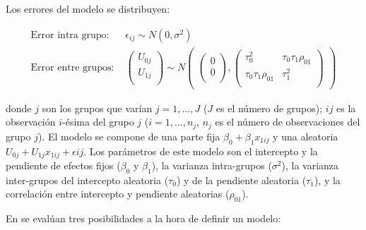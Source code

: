 \documentclass[
  12pt,
  a4paper,
  extrafontsizes,
  onecolumn,
  openright,
  table]{memoir}
\begin{document}
Los errores del modelo se distribuyen:

\[
\begin{aligned}
\text{Error intra grupo: } &  \epsilon_{ij} \sim N(0, \sigma^2) \\
\text{Error entre grupos: } &
\begin{pmatrix}
     U_{0j} \\
     U_{1j} \\
\end{pmatrix} 
\sim
N
\begin{pmatrix}
\begin{pmatrix}
     0 \\
     0 \\
\end{pmatrix},
\begin{pmatrix}
     \tau_0^2 & \tau_0\tau_1\rho_{01} \\
     \tau_0\tau_1\rho_{01} &  \tau_1^2 \\
\end{pmatrix}
\end{pmatrix} 
\end{aligned}
\]

donde \(j\) son los grupos que varían \(j = 1,...,J\) (\(J\) es el
número de grupos); \(ij\) es la observación \(i\)-ésima del grupo \(j\)
(\(i = 1,...,n_j\), \(n_j\) es el número de observaciones del grupo
\(j\)). El modelo se compone de una parte fija
\(\beta_0 + \beta_1 x_{1ij}\) y una aleatoria
\(U_{0j} + U_{1j} x_{1ij} + \epsilon{ij}\). Los parámetros de este
modelo son el intercepto y la pendiente de efectos fijos (\(\beta_0\) y
\(\beta_1\)), la varianza intra-grupos (\(\sigma^2\)), la varianza
inter-grupos del intercepto aleatoria (\(\tau_0\)) y de la pendiente
aleatoria (\(\tau_1\)), y la correlación entre intercepto y pendiente
aleatorias (\(\rho_{01}\)).

En \textcite[p.~115]{gelman2013} se evalúan tres posibilidades a la hora
de definir un modelo:
\end{document}
